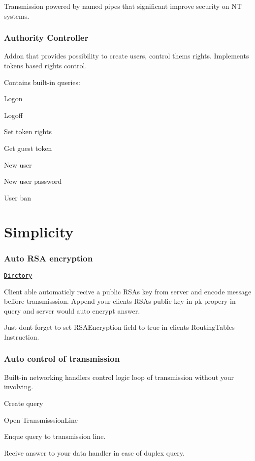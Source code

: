 Transmission powered by named pipes that significant improve security on NT systems.

\subsubsection*{Authority Controller}

Addon that provides possibility to create users, control them\textquotesingle{}s rights. Implements tokens based rights control.

Contains built-\/in queries\+:
\begin{DoxyItemize}
\item Logon
\item Logoff
\item Set token rights
\item Get guest token
\item New user
\item New user password
\item User ban
\end{DoxyItemize}

\section*{Simplicity}

\subsubsection*{Auto R\+SA encryption}

\href{./Core/PipesProvider/Security/}{\tt Dirctory}

Client able automaticly recive a public R\+SA\textquotesingle{}s key from server and encode message beffore transmisssion. Append your client\textquotesingle{}s R\+SA\textquotesingle{}s public key in {\ttfamily pk} propery in query and server would auto encrypt answer.

Just don\textquotesingle{}t forget to set {\ttfamily R\+S\+A\+Encryption} field to {\ttfamily true} in client\textquotesingle{}s {\ttfamily Routing\+Table}\textquotesingle{}s {\ttfamily Instruction}.

\subsubsection*{Auto control of transmission}

Built-\/in networking handlers control logic loop of transmission without your involving.
\begin{DoxyEnumerate}
\item Create query
\item Open {\ttfamily Transmisssion\+Line}
\item Enque query to transmission line.
\item Recive answer to your data handler in case of duplex query.
\end{DoxyEnumerate}

